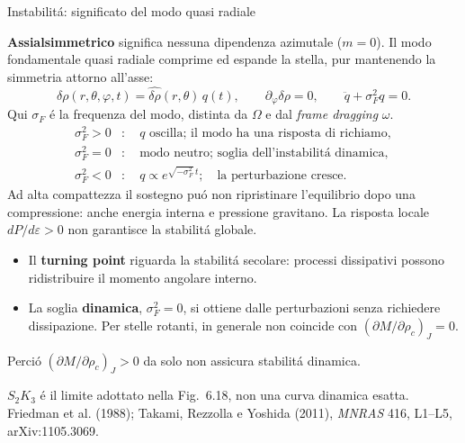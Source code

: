 \begin{frame}[t]{Instabilit\'a: significato del modo quasi radiale}
\vspace*{3mm}
\small\raggedright
\textbf{Assialsimmetrico} significa nessuna dipendenza azimutale ($m=0$).
Il modo fondamentale quasi radiale comprime ed espande la stella,
pur mantenendo la simmetria attorno all'asse:
\[
\delta\rho(r,\theta,\varphi,t)=\widehat{\delta\rho}(r,\theta)\,q(t),
\qquad \partial_\varphi\delta\rho=0,
\qquad \ddot q+\sigma_F^2q=0.
\]
Qui $\sigma_F$ \'e la frequenza del modo, distinta da $\Omega$ e dal
\emph{frame dragging} $\omega$.
\[
\begin{aligned}
\sigma_F^2>0&:\quad q\text{ oscilla; il modo ha una risposta di richiamo},\\
\sigma_F^2=0&:\quad \text{modo neutro; soglia dell'instabilit\'a dinamica},\\
\sigma_F^2<0&:\quad q\propto e^{\sqrt{-\sigma_F^2}\,t};\quad
\text{la perturbazione cresce}.
\end{aligned}
\]
Ad alta compattezza il sostegno pu\'o non ripristinare l'equilibrio dopo
una compressione: anche energia interna e pressione gravitano.
La risposta locale $dP/d\varepsilon>0$ non garantisce la stabilit\'a globale.
\par\smallskip
\begin{itemize}
\item Il \textbf{turning point} riguarda la stabilit\'a secolare:
processi dissipativi possono ridistribuire il momento angolare interno.
\item La soglia \textbf{dinamica}, $\sigma_F^2=0$, si ottiene dalle perturbazioni
senza richiedere dissipazione. Per stelle rotanti, in generale non coincide
con $\left(\partial M/\partial\rho_c\right)_J=0$.
\end{itemize}
Perci\'o $\left(\partial M/\partial\rho_c\right)_J>0$ da solo non assicura stabilit\'a dinamica.
\par\smallskip
\footnotesize
$S_2K_3$ \'e il limite adottato nella Fig.~6.18, non una curva dinamica esatta.
Friedman et al. (1988); Takami, Rezzolla e Yoshida (2011),
\emph{MNRAS} 416, L1--L5, arXiv:1105.3069.
\end{frame}

